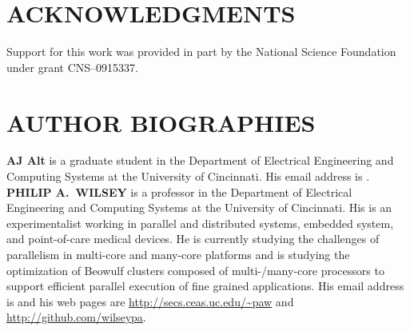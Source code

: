 \documentclass{wscpaperproc}
\begin{document}
\section*{ACKNOWLEDGMENTS}

Support for this work was provided in part by the National Science Foundation
under grant CNS--0915337.




\section*{AUTHOR BIOGRAPHIES}

\noindent \textbf{AJ Alt} is a graduate student in the Department of Electrical Engineering and Computing Systems at the University of Cincinnati. His email address is .\\

\noindent \textbf{PHILIP A.\ WILSEY} is a professor in the Department of Electrical Engineering and Computing Systems at the University of Cincinnati. His is an experimentalist working in parallel and distributed systems, embedded system, and point-of-care medical devices. He is currently studying the challenges of parallelism in multi-core and many-core platforms and is studying the optimization of Beowulf clusters composed of multi-/many-core processors to support efficient parallel execution of fine grained applications. His email address is  and his web pages are \url{http://secs.ceas.uc.edu/~paw} and \url{http://github.com/wilseypa}.
\end{document}
